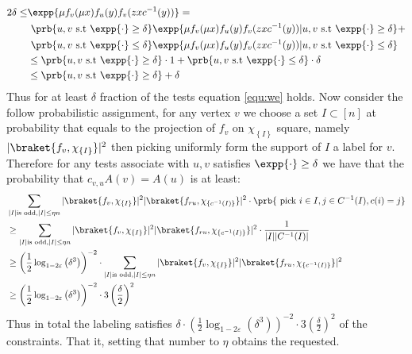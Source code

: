 \documentclass{article}
\newcommand{\Chi}[1]{\chi_{ \left\{ #1  \right\} } }
\begin{document}
  \begin{equation*}
    \begin{split}
      2\delta \le  &  \expp{\mu f_{v}(\mu x )f_{u}(y)f_{v}(zx c^{-1}(y))} = \\ 
    & \  \prb{ u,v \text{ s.t } \expp{ \cdot } \ge \delta }  \expp{\mu f_{v}(\mu x )f_{u}(y)f_{v}(zx c^{-1}(y)) | u,v \text{ s.t } \expp{ \cdot  } \ge \delta  } +\\ 
  & \  \prb{ u,v \text{ s.t } \expp{\cdot }\le \delta } \expp{\mu f_{v}(\mu x )f_{u}(y)f_{v}(zx c^{-1}(y)) | u,v \text{ s.t } \expp{\cdot } \le \delta } \\
& \le \prb{ u,v \text{ s.t } \expp{ \cdot } \ge \delta} \cdot 1 + \prb{ u,v \text{ s.t } \expp{\cdot } \le \delta}  \cdot \delta \\ 
            & \le \prb{ u,v \text{ s.t } \expp{\cdot }\ge \delta}  + \delta 
    \end{split}
  \end{equation*}
  Thus for at least $\delta$ fraction of the tests equation \ref{equ:we} holds. Now consider the follow probabilistic assignment, for any vertex $v$ we choose a set $I \subset [n]$ at probability that equals to the projection of $f_{v}$ on $\Chi{I}$ square, namely $|\braket{f_{v},\Chi{I} }|^{2}$ then picking uniformly form the support of $I$ a label for $v$. Therefore for any tests associate with $u,v$ satisfies $\expp{\cdot} \ge \delta$ we have that the probability that $c_{v,u}A(v)=A(u)$ is at least:     
  \begin{equation*}
    \begin{split}
      & \sum_{|I| \text{is odd} , |I| \le \eta n  }{|\braket{f_{v},\Chi{I} }|^{2}|\braket{f_{ru},\Chi{c^{-1}(I)} }|^{2}  \cdot \prb{\text{ pick } i \in I, j\in C^{-1}(I) , c(i)=j }  } \\ 
      & \ge \sum_{|I| \text{is odd} , |I| \le \eta n  }{|\braket{f_{v},\Chi{I} }|^{2}|\braket{f_{ru},\Chi{c^{-1}(I)} }|^{2} \cdot \frac{1}{|I||C^{-1}(I)|}} \\ 
      & \ge \left(\frac{1}{2} \log_{1-2\varepsilon}\left( \delta^{3} \right)\right)^{-2}\cdot \sum_{|I| \text{is odd} , |I| \le \eta n  }{|\braket{f_{v},\Chi{I} }|^{2}|\braket{f_{ru},\Chi{c^{-1}(I)} }|^{2}} \\
      & \ge \left(\frac{1}{2} \log_{1-2\varepsilon}\left( \delta^{3} \right)\right)^{-2}\cdot 3\left( \frac{\delta}{2} \right)^{2} 
    \end{split}
  \end{equation*}
  Thus in total the labeling satisfies $\delta \cdot \left(\frac{1}{2} \log_{1-2\varepsilon}\left( \delta^{3} \right)\right)^{-2}\cdot 3\left( \frac{\delta}{2} \right)^{2} $ of the constraints. That it, setting that number to $\eta$ obtains the requested.   
\end{document}
